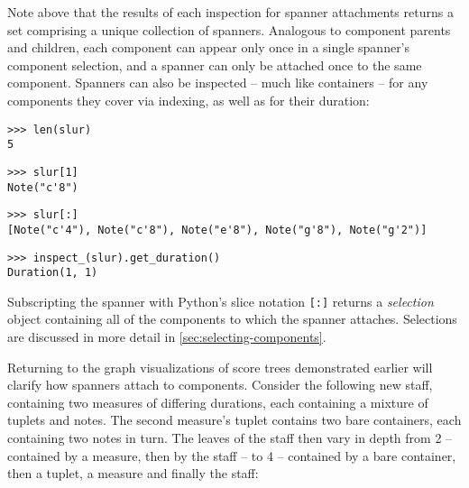 \noindent Note above that the results of each inspection for spanner
attachments returns a set comprising a unique collection of spanners. Analogous
to component parents and children, each component can appear only once in a
single spanner's component selection, and a spanner can only be attached once
to the same component. Spanners can also be inspected -- much like containers
-- for any components they cover via indexing, as well as for their duration:

\begin{comment}
<abjad>
len(slur)
slur[1]
slur[:]
inspect_(slur).get_duration()
</abjad>
\end{comment}

\begin{abjadbookoutput}
\begin{singlespacing}
\vspace{-0.5\baselineskip}
\begin{lstlisting}
>>> len(slur)
5
\end{lstlisting}
\begin{lstlisting}
>>> slur[1]
Note("c'8")
\end{lstlisting}
\begin{lstlisting}
>>> slur[:]
[Note("c'4"), Note("c'8"), Note("e'8"), Note("g'8"), Note("g'2")]
\end{lstlisting}
\begin{lstlisting}
>>> inspect_(slur).get_duration()
Duration(1, 1)
\end{lstlisting}
\end{singlespacing}
\end{abjadbookoutput}

\noindent Subscripting the spanner with Python's slice notation \texttt{[:]}
returns a \emph{selection} object containing all of the components to which the
spanner attaches. Selections are discussed in more detail in
\autoref{sec:selecting-components}.

Returning to the graph visualizations of score trees demonstrated
earlier will clarify how spanners attach to components. Consider the following
new staff, containing two measures of differing durations, each containing a
mixture of tuplets and notes. The second measure's tuplet contains two bare
containers, each containing two notes in turn. The leaves of the staff then
vary in depth from 2 -- contained by a measure, then by the staff -- to 4 --
contained by a bare container, then a tuplet, a measure and finally the staff:

\begin{comment}
<abjad>
staff = Staff()
measure_one = Measure((3, 4), r"c'4 \times 2/3 { d'4 e'4 f'4 }")
measure_two = Measure((4, 4), r"\times 3/4 { { g'4 a'4 } { b'4 c''4 } } c'4")
staff.extend([measure_one, measure_two])
show(staff)
</abjad>
\end{comment}

